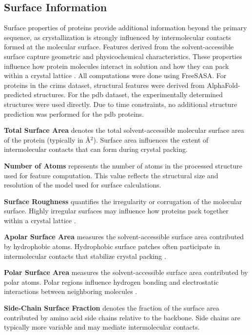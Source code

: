 \subsection{Surface Information}\label{sec:methods/feature_engineering/surfaceInformation}
Surface properties of proteins provide additional information beyond the primary sequence, as crystallization is strongly influenced by intermolecular contacts formed at the molecular surface. Features derived from the solvent-accessible surface capture geometric and physicochemical characteristics. These properties influence how protein molecules interact in solution and how they can pack within a crystal lattice \citep{Derewenda2006}.
All computations were done using FreeSASA. For proteins in the \gls{crims} dataset, structural features were derived from AlphaFold-predicted structures. For the \gls{pdb} dataset, the experimentally determined structures were used directly. Due to time constraints, no additional structure prediction was performed for the \gls{pdb} proteins.

\textbf{Total Surface Area} denotes the total solvent-accessible molecular surface area of the protein (typically in \AA$^2$). Surface area influences the extent of intermolecular contacts that can form during crystal packing.

\textbf{Number of Atoms} represents the number of atoms in the processed structure used for feature computation. This value reflects the structural size and resolution of the model used for surface calculations.

\textbf{Surface Roughness} quantifies the irregularity or corrugation of the molecular surface. Highly irregular surfaces may influence how proteins pack together within a crystal lattice \citep{Kramer2012}.

\textbf{Apolar Surface Area} measures the solvent-accessible surface area contributed by hydrophobic atoms. Hydrophobic surface patches often participate in intermolecular contacts that stabilize crystal packing \citep{Kramer2012}.

\textbf{Polar Surface Area} measures the solvent-accessible surface area contributed by polar atoms. Polar regions influence hydrogen bonding and electrostatic interactions between neighboring molecules \citep{Kramer2012}.

\textbf{Side-Chain Surface Fraction} denotes the fraction of the surface area contributed by amino acid side chains relative to the backbone. Side chains are typically more variable and may mediate intermolecular contacts.

